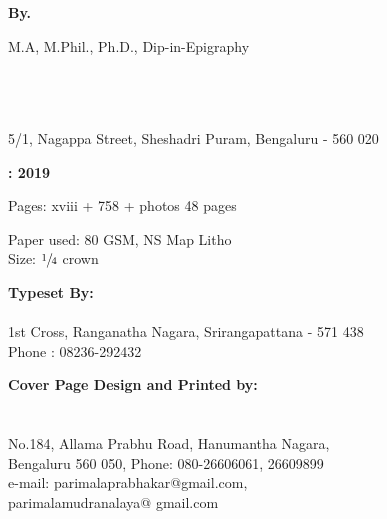 \thispagestyle{empty}

\begin{center}
{\bf {}}

\bigskip

{\bf By. } 


{\fontsize{12pt}{10pt}\selectfont M.A, M.Phil., Ph.D., Dip-in-Epigraphy}


\vfil

{}\\[3pt]
{\bf{}}\\[3pt]
{\bf{}}\relax\\
5/1, Nagappa Street, Sheshadri Puram, Bengaluru - 560 020

\vfil

\textbf{: 2019}

\vfil

Pages: xviii + 758 + photos 48 pages

\vfil

Paper used:  80 GSM, NS Map Litho\\
Size:  $\sfrac{1}{4}$ crown

\vfil

{\bf {}}

\vfil

{\bf {}}

\vfil

{\bf Typeset By:}\\[4pt]
{\bf {}}\\
{1st Cross, Ranganatha Nagara, Srirangapattana - 571 438}\\
{Phone : 08236-292432}

\vfil


{\bf Cover Page Design and Printed by:}\\[4pt]
{\bf {}}\\
{\bf {}}\\
No.184, Allama Prabhu Road, Hanumantha Nagara,\\
Bengaluru 560 050, Phone: 080-26606061, 26609899\\
e-mail:  parimalaprabhakar@gmail.com,\\
parimalamudranalaya@ gmail.com
\end{center}

